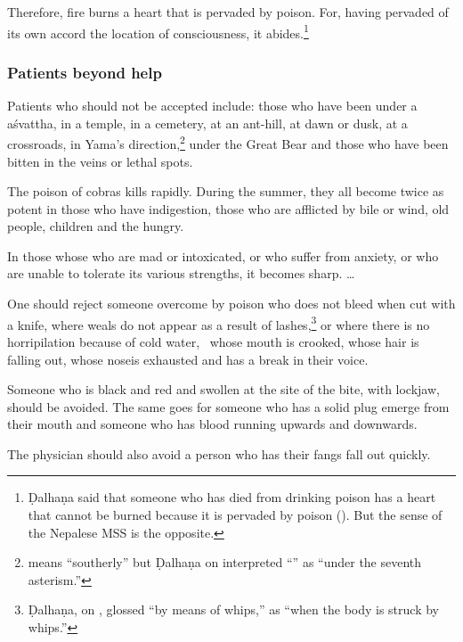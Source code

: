 \begin{translation}[resume]
\item[37]

Therefore, fire burns a heart that is pervaded by poison. For, having pervaded
of its own accord  the location of consciousness, it abides.\footnote{Ḍalhaṇa
    said that someone who has died from drinking poison has a heart that cannot
    be burned because it is pervaded by poison ().
    But the sense of the Nepalese MSS is the opposite.}

\subsubsection{Patients beyond help}

\item[38] Patients who should not be accepted include: those who have been
 under a \gls{aśvattha}, in a temple, in a cemetery, at an 
ant-hill, at
dawn or dusk, at a crossroads, in Yama's direction,\footnote{ means
    “southerly” but Ḍalhaṇa on  interpreted “” as “under the seventh asterism.”} under the Great Bear and 
    those who have been bitten in the veins or lethal spots.

\item[39]

The poison of cobras kills rapidly.  During the summer, they all become twice as 
potent in those who have indigestion, those who are afflicted by bile or wind, old 
people, children and the hungry.

\item[39.1]

In those whose who are mad or intoxicated, or who suffer from anxiety, or who
are unable to tolerate its various strengths, it becomes sharp.
\dag \ldots

\item [3.40cd--3.41]

One should reject someone overcome by poison who does not bleed when cut with
a knife, where weals do not appear as a result of lashes,\footnote{Ḍalhaṇa, on
    , glossed  “by means of whips,” as “when the
    body is struck by whips.”} %
    or where there is no horripilation because of cold water, \dag\ whose
    mouth is crooked, whose hair is falling out, whose \dag nose\dag is
    exhausted and has a break in their voice.

\item[3.42]

Someone who is black and red and swollen at the site of the bite, with lockjaw, should 
be avoided.  The same goes for someone who has a solid plug emerge from their 
mouth  and someone who has blood running upwards and downwards.

\item[3.43ab]

The physician should also avoid a person who has their fangs fall out quickly. 

\end{translation}
